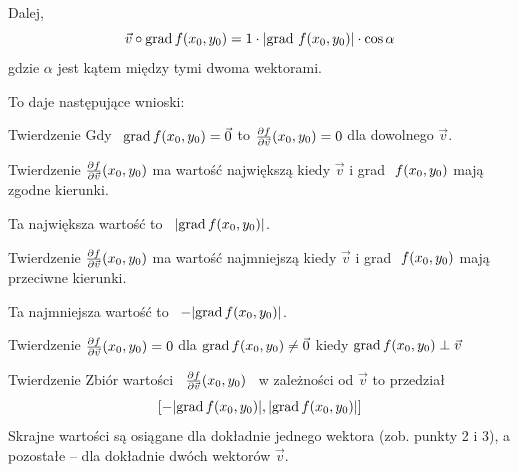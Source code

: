 Dalej,
\[ \vec{v} \circ \text{grad}\, f(x_0, y_0) = 1 \cdot | \text{grad}\ f(x_0, y_0) | \cdot \cos \alpha \]
gdzie $\alpha$ jest kątem między tymi dwoma wektorami.

To daje następujące wnioski:

\begin{tw}{Twierdzenie}
    Gdy \ $ \text{grad} \, f(x_0, y_0) = \vec{0} $
    \quad to \quad
    $ \frac{\partial f}{\partial \vec{v}} (x_0, y_0) = 0 $
    \quad dla dowolnego $ \vec{v} $.
\end{tw}

\begin{tw}{Twierdzenie}
    $ \frac{\partial f}{\partial \vec{v}} (x_0, y_0) $ ma wartość największą kiedy $\vec{v}$ i grad $\ f(x_0, y_0) $ mają zgodne kierunki.

    Ta największa wartość to \ $ | \text{grad}\, f(x_0, y_0) | $.
\end{tw}

\begin{tw}{Twierdzenie}
    $ \frac{\partial f}{\partial \vec{v}} (x_0, y_0) $ ma wartość najmniejszą kiedy $\vec{v}$ i grad $\ f(x_0, y_0) $ mają przeciwne kierunki.

    Ta najmniejsza wartość to \ $ -| \text{grad}\, f(x_0, y_0) | $.
\end{tw}

\begin{tw}{Twierdzenie}
    $ \frac{\partial f}{\partial \vec{v}} (x_0, y_0) = 0 $ \quad dla \quad $ \text{grad} \, f(x_0, y_0) \neq \vec{0} $
    \quad kiedy \quad
    $ \text{grad} \, f(x_0, y_0) \perp \vec{v} $
\end{tw}

\begin{tw}{Twierdzenie}
    Zbiór wartości \ $ \frac{\partial f}{\partial \vec{v}} (x_0, y_0) $ \ w zależności od $\vec{v}$ to przedział
    \[ [ -|\text{grad} \, f(x_0, y_0)|, |\text{grad} \, f(x_0, y_0) | ] \]
    Skrajne wartości są osiągane dla dokładnie jednego wektora (zob. punkty 2 i 3), a pozostałe -- dla dokładnie dwóch wektorów $\vec{v}$.
\end{tw}

